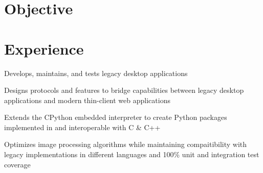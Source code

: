 \documentclass[]{resume}
\begin{document}
\begin{minipage}[t]{0.66\textwidth}

\section{Objective}
\sectionsep


\section{Experience}

\vspace{\topsep} %
\begin{tightemize}
\item Develops, maintains, and tests legacy desktop applications
\item Designs protocols and features to bridge capabilities between legacy desktop applications and modern thin-client web applications
\item Extends the CPython embedded interpreter to create Python packages implemented in and interoperable with C \& C++
\item Optimizes image processing algorithms while maintaining compaitibility with legacy implementations in different languages and 100\% unit and integration test coverage
\end{tightemize}

\sectionsep


\end{minipage}
\end{document}
